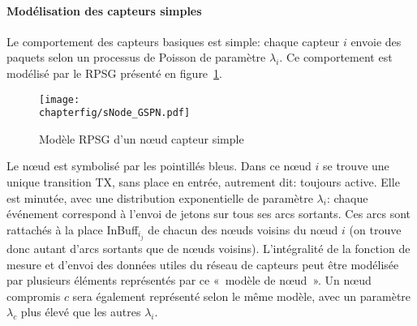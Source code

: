             \paragraph{Modélisation des capteurs simples}
Le comportement des capteurs basiques est simple: chaque capteur $i$ envoie des paquets selon un processus de Poisson de paramètre $\lambda_i$.
Ce comportement est modélisé par le RPSG présenté en figure~\ref{sa:fig:snodegspn}.
\begin{figure}[H]
    \centering
    \texttt{[image: \\chapterfig/sNode\_GSPN.pdf]}
    \caption{Modèle RPSG d'un nœud capteur simple}\label{sa:fig:snodegspn}
\end{figure}
Le nœud est symbolisé par les pointillés bleus.
Dans ce nœud $i$ se trouve une unique transition \textsf{TX}, sans place en entrée, autrement dit: toujours active.
Elle est minutée, avec une distribution exponentielle de paramètre $\lambda_i$: chaque événement correspond à l'envoi de jetons sur tous ses arcs sortants.
Ces arcs sont rattachés à la place \textsf{InBuff$_{i_j}$} de chacun des nœuds voisins du nœud $i$ (on trouve donc autant d'arcs sortants que de nœuds voisins).
L'intégralité de la fonction de mesure et d'envoi des données utiles du réseau de capteurs peut être modélisée par plusieurs éléments représentés par ce «~modèle de nœud~».
Un nœud compromis $c$ sera également représenté selon le même modèle, avec un paramètre $\lambda_c$ plus élevé que les autres $\lambda_i$.

